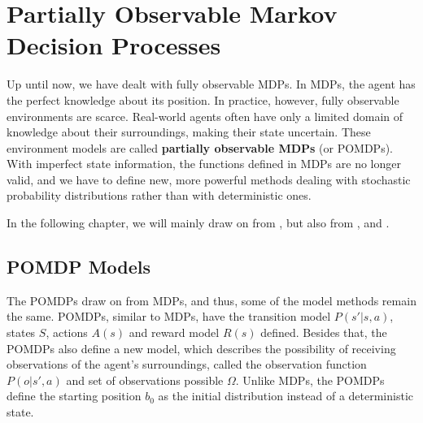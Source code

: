 \newcommand{\norm}[1]{\left\lVert#1\right\rVert}


\chapter{Partially Observable Markov Decision Processes}


Up until now, we have dealt with fully observable MDPs. In MDPs, the agent has the perfect knowledge about its position. In practice, however, fully observable environments are scarce. Real-world agents often have only a limited domain of knowledge about their surroundings, making their state uncertain. These environment models are called \textbf{partially observable MDPs} (or POMDPs). With imperfect state information, the functions defined in MDPs are no longer valid, and we have to define new, more powerful methods dealing with stochastic probability distributions rather than with deterministic ones.

 In the following chapter, we will mainly draw on from \cite{russel2010}, but also from \cite{Shani2013}, \cite{pbvi} and \cite{Walraven19}.

\section{POMDP Models}

The POMDPs draw on from MDPs, and thus, some of the model methods remain the same. POMDPs, similar to MDPs, have the transition model $P(s'|s,a)$, states $S$, actions $A(s)$ and reward model $R(s)$ defined. Besides that, the POMDPs also define a new model, which describes the possibility of receiving observations of the agent's surroundings, called the observation function $P(o|s', a)$ and set of observations possible $\Omega$. Unlike MDPs, the POMDPs define the starting position $b_0$ as the initial distribution instead of a deterministic state. 


